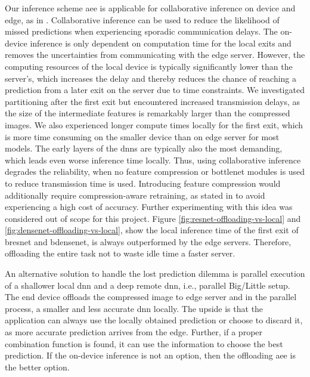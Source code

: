 Our inference scheme \gls{aee} is applicable for collaborative inference on device and edge, as in \cite{leroux_cascading_2017,teerapittayanon_distributed_2017}. Collaborative inference can be used to reduce the likelihood of missed predictions when experiencing sporadic communication delays. The on-device inference is only dependent on computation time for the local exits and removes the uncertainties from communicating with the edge server. However, the computing resources of the local device is typically significantly lower than the server's, which increases the delay and thereby reduces the chance of reaching a prediction from a later exit on the server due to time constraints. We investigated partitioning after the first exit but encountered increased transmission delays, as the size of the intermediate features is remarkably larger than the compressed images. We also experienced longer compute times locally for the first exit, which is more time consuming on the smaller device than on edge server for most models. The early layers of the \gls{dnn}s are typically also the most demanding, which leads even worse inference time locally. Thus, using collaborative inference degrades the reliability, when no feature compression or \gls{bottlenet} modules is used to reduce transmission time is used. Introducing feature compression would additionally require compression-aware retraining, as stated in \cite{choi_near-lossless_2018,choi_near-lossless_2018,eshratifar_bottlenet:_2019}  to avoid experiencing a high cost of accuracy. Further experimenting with this idea was considered out of scope for this project. Figure \ref{fig:resnet-offloading-vs-local} and \ref{fig:densenet-offloading-vs-local}, show the local inference time of the first exit of \gls{bresnet} and \gls{bdensenet}, is always outperformed by the edge servers. Therefore, offloading the entire task not to waste idle time a faster server.

An alternative solution to handle the lost prediction dilemma is parallel execution of a shallower local \gls{dnn} and a deep remote \gls{dnn}, i.e., parallel Big/Little setup. The end device offloads the compressed image to edge server and in the parallel process, a smaller and less accurate \gls{dnn} locally. The upside is that the application can always use the locally obtained prediction or choose to discard it, as more accurate prediction arrives from the edge. Further, if a proper combination function is found, it can use the information to choose the best prediction. If the on-device inference is not an option, then the offloading \gls{aee} is the better option.

